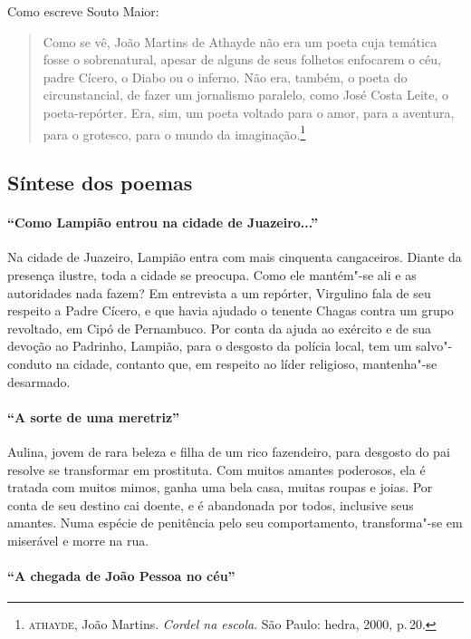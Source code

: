 Como escreve Souto Maior:

\begin{quote}
Como se vê, João Martins de Athayde não era um poeta
cuja temática fosse o sobrenatural, apesar de alguns de seus
folhetos enfocarem o céu, padre Cícero, o Diabo ou o
inferno. Não era, também, o poeta do circunstancial, de
fazer um jornalismo paralelo, como José Costa Leite, o
poeta-repórter. Era, sim, um poeta voltado para o amor,
para a aventura, para o grotesco, para o mundo da
imaginação.\footnote{\textsc{athayde}, João Martins. \textit{Cordel na escola}. São Paulo: hedra, 2000, p.\,20.}
\end{quote}

\subsection{Síntese dos poemas}

\paragraph{``Como Lampião entrou na cidade de
Juazeiro...''}

Na cidade de Juazeiro, Lampião entra com mais cinquenta cangaceiros. Diante da
presença ilustre, toda a cidade se preocupa. Como ele mantém"-se ali e as
autoridades nada fazem? Em entrevista a um repórter, Virgulino fala de
seu respeito a Padre Cícero, e que havia ajudado o tenente Chagas
contra um grupo revoltado, em Cipó de Pernambuco. Por conta da ajuda ao
exército e de sua devoção ao Padrinho, Lampião, para o desgosto da
polícia local, tem um salvo"-conduto na cidade, contanto que, em respeito
ao líder religioso, mantenha"-se desarmado. 

\paragraph{``A sorte de uma meretriz''}

Aulina, jovem de rara beleza e filha de um rico fazendeiro, para
desgosto do pai resolve se transformar em prostituta. Com muitos
amantes poderosos, ela é tratada com muitos mimos, ganha uma bela casa,
muitas roupas e joias. Por conta de seu destino cai doente, e é
abandonada por todos, inclusive seus amantes. Numa espécie de
penitência pelo seu comportamento, transforma"-se em miserável e morre
na rua. 

\paragraph{``A chegada de João Pessoa no céu''}

